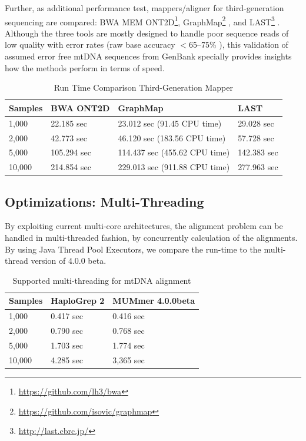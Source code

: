 Further, as additional performance test, mappers/aligner for third-generation sequencing are compared: BWA MEM ONT2D\footnote{\url{https://github.com/lh3/bwa}}, GraphMap\footnote{\url{https://github.com/isovic/graphmap}} \cite{Sovi2016}, and LAST\footnote{\url{http://last.cbrc.jp/}} \cite{Kielbasa2011}. Although the three tools are mostly designed to handle poor sequence reads of low quality with error rates (raw base accuracy $<$65–75\% \cite{Sovi2016}), this validation of assumed error free mtDNA sequences from GenBank \cite{Yao2009} specially provides insights how the methods perform in terms of speed.
\begin{table}[H]
\centering
\caption{Run Time Comparison Third-Generation Mapper}
\label{align:comp3Gen}
\begin{tabular}{|l|l|l|l|}
\hline
Samples & BWA ONT2D & GraphMap & LAST \\ \hline
1,000 &    22.185 sec  &  23.012 sec (91.45 CPU time)  &    29.028 sec    \\ \hline
2,000 &    42.773 sec &  46.120 sec (183.56 CPU time)   &   57.728 sec   \\ \hline
5,000  &   105.294 sec &   114.437 sec (455.62 CPU time) &  142.383 sec   \\ \hline
10,000 &   214.854 sec &  229.013 sec (911.88 CPU time) &  277.963  sec    \\ \hline
\end{tabular}
\end{table}

\subsection{Optimizations: Multi-Threading}
By exploiting current multi-core architectures, the alignment problem can be handled in multi-threaded fashion, by concurrently calculation of the alignments. By using Java Thread Pool Executors, we compare the run-time to the multi-thread version of  4.0.0 beta. 

\begin{table}[H]
\centering
\caption{Supported multi-threading for mtDNA alignment}
\label{time:threads}
\begin{tabular}{|l|l|l|}
\hline
Samples &  HaploGrep 2 &  MUMmer 4.0.0beta   \\ \hline
1,000    & 0.417 sec  &   0.416 sec       \\ \hline
2,000    & 0.790 sec &   0.768 sec       \\ \hline
5,000    & 1.703 sec &   1.774 sec       \\ \hline
10,000   & 4.285 sec &   3,365 sec       \\ \hline 
\end{tabular}
\end{table}


